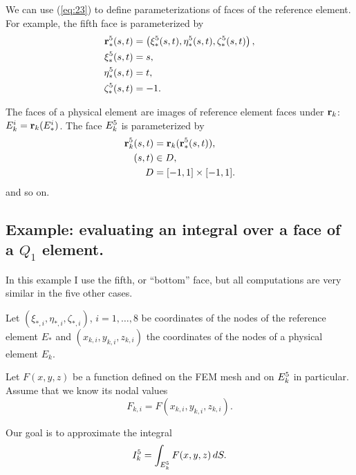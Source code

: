 \documentclass[11pt]{article}
\begin{document}
\renewcommand{\F}[2]{#1_{#2}^{5}}
We can use (\ref{eq:23}) to define parameterizations of faces of the
reference element. For example, the fifth face is parameterized by
\begin{equation}
  \label{eq:24}
  \begin{aligned}
    \Fr{\R}(s,t) &= \left( \Fr{\xi}(s,t), \Fr{\eta}(s,t), \Fr{\zeta}(s,t) \right),\\
    \Fr{\xi}(s,t) &= s,\\
    \Fr{\eta}(s,t) &= t,\\
    \Fr{\zeta}(s,t) &= -1.
  \end{aligned}
\end{equation}

The faces of a physical element are images of reference element faces
under $\mathbf{r}_{k}$: $E_{k}^{i} = \mathbf{r}_{k}(E_{*}^{i})$. The face $\Fk{E}$ is
parameterized by
\begin{equation}
\label{eq:25}
\begin{aligned}
  \Fk{\R}(s, t) &= \R_{k}(\Fr{\R}(s,t)),\\
  (s,t) &\in D,\\
  D &= [-1, 1] \times [-1, 1].
\end{aligned}
\end{equation}
and so on.

\subsection{Example: evaluating an integral over a face of a $Q_{1}$ element.}
\label{sec-4-1}

\newcommand{\face}{\Fk{E}}

In this example I use the fifth, or ``bottom'' face, but all
computations are very similar in the five other cases.

Let $(\xi_{*,i}, \eta_{*,i}, \zeta_{*,i})$, $i = 1,\dots,8$ be coordinates
of the nodes of the reference element $E_{*}$ and $(x_{k,i}, y_{k,i},
z_{k,i})$ the coordinates of the nodes of a physical element $E_{k}$.

Let $F(x,y,z)$ be a function defined on the FEM mesh and on $\face$
in particular. Assume that we know its nodal values
\begin{equation*}
F_{k,i} = F(x_{k,i}, y_{k,i}, z_{k,i}).
\end{equation*}

Our goal is to approximate the integral
\begin{equation}
\label{eq:26}
\Fk{I} = \int_{\face} F(x,y,z)\, dS.
\end{equation}
\end{document}
